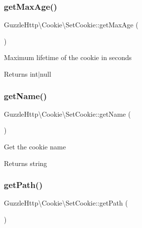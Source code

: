 \subsubsection{\texorpdfstring{get\+Max\+Age()}{getMaxAge()}}
{\footnotesize\ttfamily Guzzle\+Http\textbackslash{}\+Cookie\textbackslash{}\+Set\+Cookie\+::get\+Max\+Age (\begin{DoxyParamCaption}{ }\end{DoxyParamCaption})}

Maximum lifetime of the cookie in seconds

\begin{DoxyReturn}{Returns}
int$\vert$null 
\end{DoxyReturn}
\mbox{\label{classGuzzleHttp_1_1Cookie_1_1SetCookie_a573b2821257add2459ac921f74d05931}} 
\subsubsection{\texorpdfstring{get\+Name()}{getName()}}
{\footnotesize\ttfamily Guzzle\+Http\textbackslash{}\+Cookie\textbackslash{}\+Set\+Cookie\+::get\+Name (\begin{DoxyParamCaption}{ }\end{DoxyParamCaption})}

Get the cookie name

\begin{DoxyReturn}{Returns}
string 
\end{DoxyReturn}
\mbox{\label{classGuzzleHttp_1_1Cookie_1_1SetCookie_abc668af0d59edafcf6e050c225581437}} 
\subsubsection{\texorpdfstring{get\+Path()}{getPath()}}
{\footnotesize\ttfamily Guzzle\+Http\textbackslash{}\+Cookie\textbackslash{}\+Set\+Cookie\+::get\+Path (\begin{DoxyParamCaption}{ }\end{DoxyParamCaption})}

